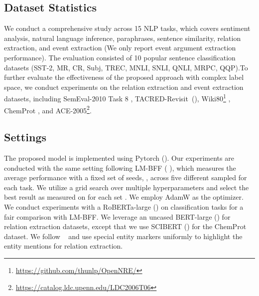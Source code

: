 \documentclass{article} \usepackage{iclr2022_conference,times}
\begin{document}
\subsection{Dataset Statistics}
We conduct a comprehensive study across 15 NLP tasks, which covers sentiment analysis, natural language inference, paraphrases, sentence similarity, relation extraction, and event extraction (We only report event argument extraction performance). 
The evaluation consisted of 10  popular sentence classification datasets (SST-2, MR, CR, Subj, TREC, MNLI, SNLI, QNLI, MRPC, QQP).To further evaluate the effectiveness of the proposed approach with complex label space, we conduct experiments on the relation extraction and event extraction datasets, including SemEval-2010 Task 8 \citep{DBLP:conf/semeval/HendrickxKKNSPP10}, TACRED-Revisit~(\cite{DBLP:conf/acl/AltGH20a}), Wiki80\footnote{\url{https://github.com/thunlp/OpenNRE/}} \citep{DBLP:conf/emnlp/HanGYYLS19}, ChemProt \citep{DBLP:journals/biodb/KringelumKBLOT16}, and ACE-2005\footnote{\url{https://catalog.ldc.upenn.edu/LDC2006T06}}.

\subsection{Settings}
\label{sec:setting}

The proposed model is implemented using Pytorch (\cite{DBLP:conf/nips/PaszkeGMLBCKLGA19}).
Our experiments are conducted with the same setting following LM-BFF ( \cite{DBLP:journals/corr/abs-2012-15723}), which measures the average performance with a fixed set of seeds, , across five different sampled  for each task. 
We utilize a grid search over multiple hyperparameters and select the best result as measured on  for each set .
We employ AdamW as the optimizer. 
We conduct experiments with a RoBERTa-large (\cite{DBLP:journals/corr/abs-1907-11692}) on classification tasks for a fair comparison with LM-BFF.
We leverage an uncased BERT-large (\cite{DBLP:conf/naacl/DevlinCLT19}) for relation extraction datasets, except that we use SCIBERT (\cite{DBLP:conf/emnlp/BeltagyLC19}) for the ChemProt dataset. 
We follow ~\cite{DBLP:conf/acl/SoaresFLK19} and use special entity markers uniformly to highlight the entity mentions for relation extraction. 
\end{document}
